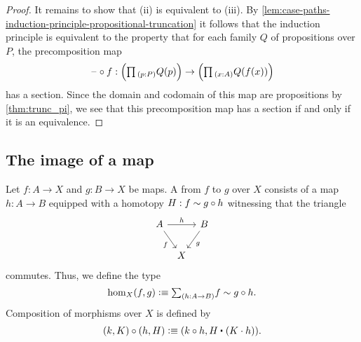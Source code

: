 \begin{proof}
  It remains to show that (ii) is equivalent to (iii). By \cref{lem:case-paths-induction-principle-propositional-truncation} it follows that the induction principle is equivalent to the property that for each family $Q$ of propositions over $P$, the precomposition map
  \begin{equation*}
    \blank\circ f : \Big(\prd{p:P}Q(p)\Big)\to\Big(\prd{x:A}Q(f(x))\Big)
  \end{equation*}
  has a section. Since the domain and codomain of this map are propositions by \cref{thm:trunc_pi}, we see that this precomposition map has a section if and only if it is an equivalence.
\end{proof}

\subsection{The image of a map}\label{sec:image-construction}

\begin{defn}
  Let $f:A\to X$ and $g:B\to X$ be maps. A  from $f$ to $g$ over $X$ consists of a map $h:A\to B$ equipped with a homotopy $H:f\sim g\circ h$ witnessing that the triangle
\begin{equation*}
\begin{tikzcd}[column sep=tiny]
A \arrow[rr,"h"] \arrow[dr,swap,"f"] & & B \arrow[dl,"g"] \\
& X
\end{tikzcd}
\end{equation*}
commutes. Thus, we define the type
\begin{equation*}
\mathrm{hom}_X(f,g)\defeq\sm{h:A\to B}f\htpy g\circ h.
\end{equation*}
Composition of morphisms over $X$ is defined by
\begin{equation*}
  (k,K)\circ (h,H) \defeq (k\circ h,\ct{H}{(K\cdot h)}).
\end{equation*}
\end{defn}

